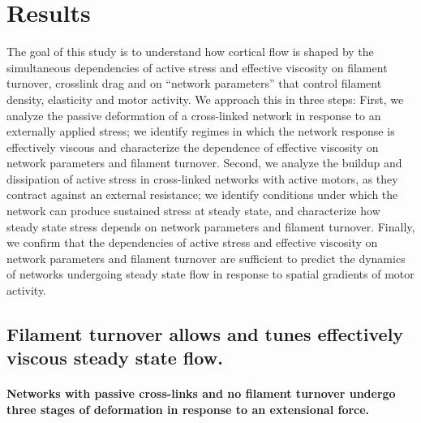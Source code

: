 \section*{Results}
The goal of this study is to understand how cortical flow is shaped by the simultaneous dependencies of active stress and effective viscosity on filament turnover, crosslink drag and on ``network parameters'' that control  filament density, elasticity and motor activity.   We approach this in three steps: First, we analyze the passive deformation of a cross-linked network in response to an externally applied stress; we identify regimes in which the network response is effectively viscous and characterize the dependence of effective viscosity on network parameters and filament turnover.  Second, we analyze the buildup and dissipation of active stress in cross-linked networks with active motors, as they contract against an external resistance; we identify conditions under which the network can produce sustained stress at steady state, and characterize how steady state stress depends on network parameters and filament turnover. Finally, we confirm that the dependencies of active stress and effective viscosity on network parameters and filament turnover are sufficient to predict the dynamics of networks undergoing steady state flow in response to spatial gradients of motor activity.
\subsection*{Filament turnover allows and tunes effectively viscous steady state flow.}

\paragraph{Networks with passive cross-links and no filament turnover undergo three stages of deformation in response to an extensional force.} 

